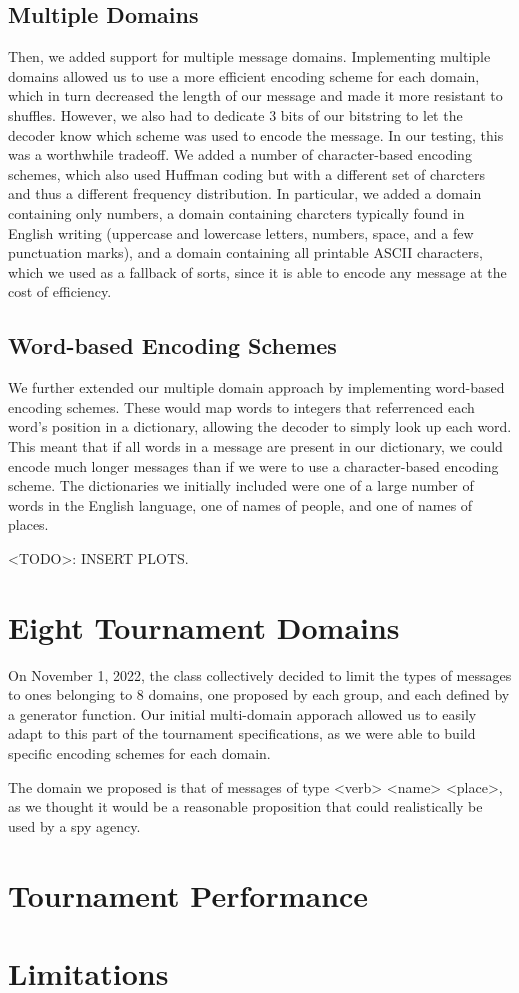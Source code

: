 \documentclass{article}
\begin{document}
\subsection{Multiple Domains}
Then, we added support for multiple message domains. Implementing multiple domains allowed us to use a more efficient encoding scheme for each domain, which in turn decreased the length of our message and made it more resistant to shuffles. However, we also had to dedicate 3 bits of our bitstring to let the decoder know which scheme was used to encode the message. In our testing, this was a worthwhile tradeoff. We added a number of character-based encoding schemes, which also used Huffman coding but with a different set of charcters and thus a different frequency distribution. In particular, we added a domain containing only numbers, a domain containing charcters typically found in English writing (uppercase and lowercase letters, numbers, space, and a few punctuation marks), and a domain containing all printable ASCII characters, which we used as a fallback of sorts, since it is able to encode any message at the cost of efficiency.

\subsection{Word-based Encoding Schemes}
We further extended our multiple domain approach by implementing word-based encoding schemes. These would map words to integers that referrenced each word's position in a dictionary, allowing the decoder to simply look up each word. This meant that if all words in a message are present in our dictionary, we could encode much longer messages than if we were to use a character-based encoding scheme. The dictionaries we initially included were one of a large number of words in the English language, one of names of people, and one of names of places.

<TODO>: INSERT PLOTS.

\section{Eight Tournament Domains}

On November 1, 2022, the class collectively decided to limit the types of messages to ones belonging to 8 domains, one proposed by each group, and each defined by a generator function. Our initial multi-domain apporach allowed us to easily adapt to this part of the tournament specifications, as we were able to build specific encoding schemes for each domain.

The domain we proposed is that of messages of type <verb> <name> <place>, as we thought it would be a reasonable proposition that could realistically be used by a spy agency.

\section{Tournament Performance}

\section{Limitations}


    
\end{document}
